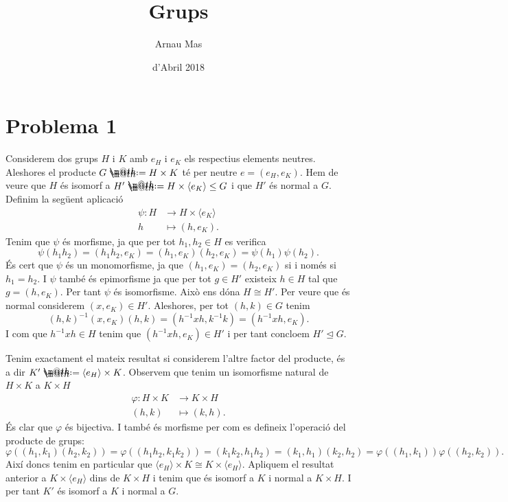 \documentclass[12pt]{article}
\title{\sffamily {\bfseries Entrega 1:} Grups}
\author{\sffamily Arnau Mas}
\date{\sffamily 24 d'Abril 2018}
\makeatletter
\newcommand{\gen}[1]{\langle #1 \rangle}
\newcommand{\normal}{\trianglelefteq}
\newcommand*{\defeq}{\mathrel{\rlap{%
    \raisebox{0.3ex}{$\m@th\cdot$}}%
  \raisebox{-0.3ex}{$\m@th\cdot$}}%
=}
\makeatother
\begin{document}
\maketitle
\section{Problema 1}
Considerem dos grups \( H \) i \( K \) amb \( e_H \) i \( e_K \) els respectius elements neutres. Aleshores el producte \( G \defeq H \times K \) té per neutre \( e = (e_H, e_K) \). Hem de veure que \( H \) és isomorf a \( H' \defeq H \times \gen{e_K} \leq G \) i que \( H' \) és normal a \( G \). Definim la següent aplicació
\begin{align*}
	\psi \colon H & \longrightarrow H \times \gen{e_K} \\
	h & \longmapsto (h, e_K). 
\end{align*}
Tenim que \( \psi \) és morfisme, ja que per tot \( h_1, h_2 \in H \) es verifica
\begin{equation*}
	\psi(h_1h_2) = (h_1h_2,e_K) = (h_1,e_K) (h_2,e_K) = \psi(h_1)\psi(h_2).
\end{equation*}
És cert que \( \psi \) és un monomorfisme, ja que \( (h_1, e_K) = (h_2,e_K) \) si i només si \( h_1 = h_2 \). I \( \psi \) també és epimorfisme ja que per tot \( g \in H' \) existeix \( h \in H \) tal que \( g = (h,e_K) \). Per tant \( \psi \) és isomorfisme. Això ens dóna \( H \cong H' \). Per veure que és normal considerem \( (x,e_K) \in H' \). Aleshores, per tot \( (h, k) \in G \) tenim
\begin{equation*}
	(h, k)^{-1}(x,e_K)(h,k) = (h^{-1}xh, k^{-1}k) = (h^{-1}xh, e_K).
\end{equation*}
I com que \( h^{-1}xh \in H \) tenim que \( (h^{-1}xh, e_K) \in H' \) i per tant concloem \( H' \normal G \). 

Tenim exactament el mateix resultat si considerem l'altre factor del producte, és a dir \( K' \defeq \gen{e_H} \times K \). Observem que tenim un isomorfisme natural de \( H \times K \) a \( K \times H \) 
\begin{align*}
	\varphi \colon H \times K &\longrightarrow K \times H \\
	(h, k) & \longmapsto (k,h).
\end{align*}
És clar que \( \varphi \) és bijectiva. I també és morfisme per com es defineix l'operació del producte de grups:
\begin{equation*}
	\varphi((h_1,k_1)(h_2,k_2)) = \varphi((h_1h_2,k_1k_2)) = (k_1k_2,h_1h_2) = (k_1,h_1)(k_2,h_2) = \varphi((h_1,k_1))\varphi((h_2,k_2)).
\end{equation*}
Així doncs tenim en particular que \( \gen{e_H} \times K \cong K \times \gen{e_H} \). Apliquem el resultat anterior a \( K \times \gen{e_H} \) dins de \( K \times H \) i tenim que és isomorf a \( K \) i normal a \( K \times H \). I per tant \( K' \) és isomorf a \( K \) i normal a \( G \).  
\end{document}
